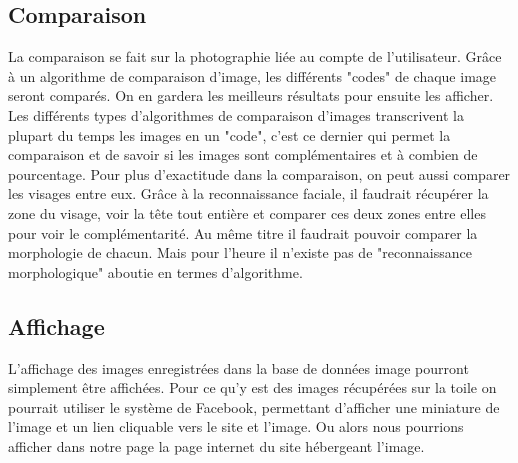 \documentclass[a4paper,12pt]{article}
\begin{document}
 \subsection{Comparaison}
 La comparaison se fait sur la photographie liée au compte de l'utilisateur. Grâce à un algorithme de comparaison d'image, les différents "codes" de chaque image seront comparés. On en gardera les meilleurs résultats pour ensuite les afficher. Les différents types d'algorithmes de comparaison d'images transcrivent la plupart du temps les images en un "code", c'est ce dernier qui permet la comparaison et de savoir si les images sont complémentaires et à combien de pourcentage. Pour plus d'exactitude dans la comparaison, on peut aussi comparer les visages entre eux. Grâce à la reconnaissance faciale, il faudrait récupérer la zone du visage, voir la tête tout entière et comparer ces deux zones entre elles pour voir le complémentarité. Au même titre il faudrait pouvoir comparer la morphologie de chacun. Mais pour l'heure il n'existe pas de "reconnaissance morphologique" aboutie en termes d'algorithme. 

\subsection{Affichage}
L'affichage des images enregistrées dans la base de données image pourront simplement être affichées. Pour ce qu'y est des images récupérées sur la toile on pourrait utiliser le système de Facebook, permettant d'afficher une miniature de l'image et un lien cliquable vers le site et l'image. Ou alors nous pourrions afficher dans notre page la page internet du site hébergeant l'image. 
\end{document}
